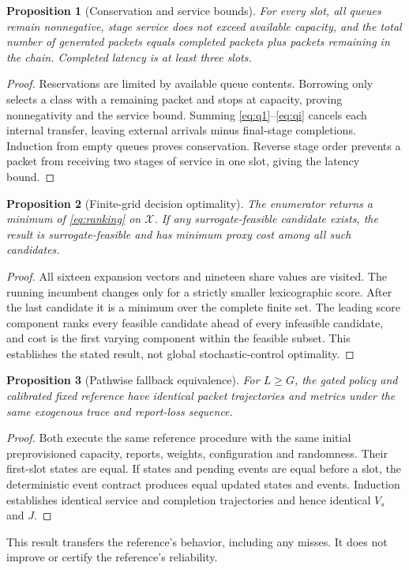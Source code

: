 \documentclass[10pt,a4paper]{article}
\newtheorem{proposition}{Proposition}
\begin{document}
\begin{proposition}[Conservation and service bounds]
For every slot, all queues remain nonnegative, stage service does not exceed
available capacity, and the total number of generated packets equals completed
packets plus packets remaining in the chain. Completed latency is at least
three slots.
\end{proposition}
\begin{proof}
Reservations are limited by available queue contents. Borrowing only selects a
class with a remaining packet and stops at capacity, proving nonnegativity and
the service bound. Summing \eqref{eq:q1}--\eqref{eq:qi} cancels each internal
transfer, leaving external arrivals minus final-stage completions. Induction
from empty queues proves conservation. Reverse stage order prevents a packet
from receiving two stages of service in one slot, giving the latency bound.
\end{proof}

\begin{proposition}[Finite-grid decision optimality]
The enumerator returns a minimum of \eqref{eq:ranking} on $\mathcal X$.
If any surrogate-feasible candidate exists, the result is surrogate-feasible
and has minimum proxy cost among all such candidates.
\end{proposition}
\begin{proof}
All sixteen expansion vectors and nineteen share values are visited. The
running incumbent changes only for a strictly smaller lexicographic score.
After the last candidate it is a minimum over the complete finite set. The
leading score component ranks every feasible candidate ahead of every infeasible
candidate, and cost is the first varying component within the feasible subset.
This establishes the stated result, not global stochastic-control optimality.
\end{proof}

\begin{proposition}[Pathwise fallback equivalence]
For $L\ge G$, the gated policy and calibrated fixed reference have identical
packet trajectories and metrics under the same exogenous trace and report-loss
sequence.
\end{proposition}
\begin{proof}
Both execute the same reference procedure with the same initial preprovisioned
capacity, reports, weights, configuration and randomness. Their first-slot
states are equal. If states and pending events are equal before a slot, the
deterministic event contract produces equal updated states and events.
Induction establishes identical service and completion trajectories and hence
identical $V_s$ and $J$.
\end{proof}
This result transfers the reference's behavior, including any misses. It does
not improve or certify the reference's reliability.
\end{document}
